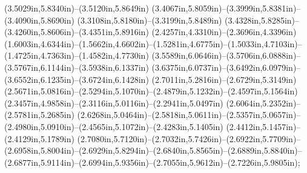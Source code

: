 (3.5029in,5.8340in)--(3.5120in,5.8649in) (3.4067in,5.8059in)--(3.3999in,5.8381in)--(3.4090in,5.8690in) (3.3108in,5.8180in)--(3.3199in,5.8489in) (3.4328in,5.8285in)--(3.4260in,5.8606in)--(3.4351in,5.8916in) (2.4257in,4.3310in)--(2.3696in,4.3396in) (1.6003in,4.6344in)--(1.5662in,4.6602in)--(1.5281in,4.6775in)--(1.5033in,4.7103in)--(1.4725in,4.7363in)--(1.4582in,4.7730in) (3.5589in,6.0646in)--(3.5706in,6.0888in)--(3.5767in,6.1144in)--(3.5938in,6.1337in) (3.6375in,6.0737in)--(3.6492in,6.0979in)--(3.6552in,6.1235in)--(3.6724in,6.1428in) (2.7011in,5.2816in)--(2.6729in,5.3149in) (2.5671in,5.0816in)--(2.5294in,5.1070in)--(2.4879in,5.1232in)--(2.4597in,5.1564in) (2.3457in,4.9858in)--(2.3116in,5.0116in)--(2.2941in,5.0497in) (2.6064in,5.2352in)--(2.5781in,5.2685in) (2.6268in,5.0464in)--(2.5818in,5.0611in)--(2.5357in,5.0657in)--(2.4980in,5.0910in)--(2.4565in,5.1072in)--(2.4283in,5.1405in) (2.4412in,5.1457in)--(2.4129in,5.1789in) (2.7080in,5.7120in)--(2.7032in,5.7426in)--(2.6922in,5.7709in)--(2.6958in,5.8004in)--(2.6929in,5.8294in)--(2.6840in,5.8565in)--(2.6889in,5.8840in)--(2.6877in,5.9114in)--(2.6994in,5.9356in)--(2.7055in,5.9612in)--(2.7226in,5.9805in);
